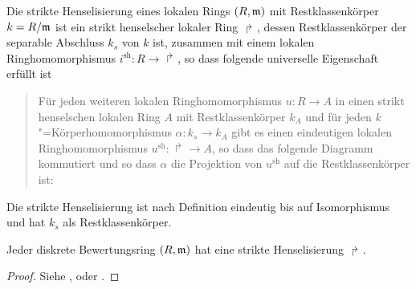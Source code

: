 
\begin{Definition}\label{def:striktehenselisierung}
  Die strikte Henselisierung eines lokalen Rings $(R,\mathfrak{m})$ mit
  Restklassenkörper $k=R/\mathfrak{m}$ ist ein strikt henselscher lokaler Ring
  $\Rsh$, dessen Restklassenkörper der separable Abschluss $k_s$ von
  $k$ ist, zusammen mit einem lokalen Ringhomomorphismus
  ${i^\text{sh}\colon R\to\Rsh}$, so dass folgende universelle
  Eigenschaft erfüllt ist
  \begin{quote}
    Für jeden weiteren lokalen Ringhomomorphismus $u\colon R\to A$ in
    einen strikt henselschen lokalen Ring $A$ mit Restklassenkörper
    $k_A$ und für jeden $k$"=Körperhomomorphismus $\alpha\colon k_s\to k_A$
    gibt es einen eindeutigen lokalen Ringhomomorphismus
    ${u^\text{sh}\colon\Rsh\to A}$, so dass das folgende Diagramm
    kommutiert und so dass $\alpha$ die Projektion von $u^\text{sh}$
    auf die Restklassenkörper ist:
    \begin{center}
    \end{center}
  \end{quote}
  Die strikte Henselisierung ist nach Definition eindeutig bis auf
  Isomorphismus und hat $k_s$ als Restklassenkörper.
\end{Definition}

\begin{Satz}
  \label{thm:exhenselisierung}
  Jeder diskrete Bewertungsring $(R,\mathfrak{m})$ hat eine
  strikte Henselisierung $\Rsh$.
  \begin{proof}
    Siehe
    \cite[Proposition~IV.6.5]{silverman2},
    \cite[Remark~IV.6.6.2]{silverman2}
    oder \cite[Chapter~2.3, S.\,48]{neron}.
  \end{proof}
\end{Satz}

